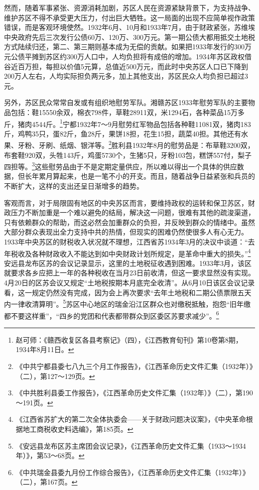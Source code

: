 然而，随着军事紧张、资源消耗加剧，苏区人民在资源紧缺背景下，为支持战争、维护苏区不得不承受更大压力，付出巨大牺牲。这一局面的出现不应简单视作政策错误，而是客观环境使然。1932年6月、10月和1933年7月，由于财政紧张，苏维埃中央政府先后三次发行公债60万、120万、300万元。第一期公债大都用抵交土地税方式陆续归还，第二、第三期则基本成为无偿的贡献。如果把1933年发行的300万元公债平摊到苏区约300万人口中，人均负担将有成倍的增加。1934年苏区政权借谷近百万担，每担以价值5元算，总值近500万元，而此时中央苏区人口已下降到200万人左右，人均实际担负两元多，加上其他支出，苏区民众人均负担已超过3元。


另外，苏区民众常常自发或有组织地慰劳军队。湘赣苏区1933年慰劳军队的主要物品包括：鞋15550余双，棉衣798件，草鞋28911双，米1294石，各种菜品15万多斤，猪肉4544斤。\footnote{赵可师：《赣西收复区各县考察记》（四），《江西教育旬刊》第10卷第8期，1934年8月11日。}宁都1932年7～9月慰劳红军物品包括各种鞋11081双，猪肉183斤，鸡鸭35只，蛋82斤，鱼28斤，果饼18担，花生15担，蔬菜40担。其他还有水果、牙粉、牙刷、纸烟、银洋等。\footnote{《中共宁都县委七八九三个月工作报告》，《江西革命历史文件汇集（1932年）》（二），第127～129页。}胜利县1932年8月的慰劳品是：布草鞋3200双，布套鞋920双，头牲143斤，鸡蛋5730个，生猪5只，牙粉103包，糕饼557付，梨子四担等。\footnote{《中共胜利县委工作报告》，《江西革命历史文件汇集（1932年）》（二），第190～191页。}这些慰劳品由于不是定期定量供应，所以难以得出一个具体的供应数据，但长年累月算起来，也是一笔不小的开支。而且，随着战争日益紧张和兵员的不断扩大，这样的支出还呈日渐增多的趋势。


客观而言，对于局限固有地区的中央苏区而言，要维持政权的运转和保卫苏区，财政压力不断加重是一个难以避免的结局，解决这一问题，很难有其他的疏浚渠道，只有依赖群众的帮助，而这必然会加重群众的负担，并反映到群众的情绪中。虽然大部分群众表现出全力支持中共的热情，但现实的困难仍然使很多人有心无力。1933年中央苏区的财税收入状况就不理想，江西省苏1934年3月的决议中谈道：“去年税收及各种财政收入不能达到如中央财政计划所规定，是革命中重大的损失。”\footnote{《江西省苏扩大的第二次全体执委会——关于财政问题决议案》，《中央革命根据地工商税收史料选编》，第185页。}安远县龙布区苏的会议记录显示，这里的土地税征收遇到困难。1933年3月，该区就要求各乡应把上一年的各种税收在当月23日前收清，但这一要求显然没有实现。4月20日的区苏会议又规定“土地税按期本月底完全收清”。从6月10日该区会议记录看，这一规定仍然没有完成，因为会上再次要求“去年土地税和二期公债票限五天内一律收清算明”。\footnote{《安远县龙布区苏主席团会议记录》，《江西革命历史文件汇集（1933～1934年）》，第53～68页。}苏区中心地区的瑞金沿江区群众也对缴税抵触，抱怨“旧年缴都不要这样重”，“四乡的党团和代表都带群众到区委区苏要求减少”。\footnote{《中共瑞金县委九月份工作综合报告》，《江西革命历史文件汇集（1932年）》（二），第167页。}


